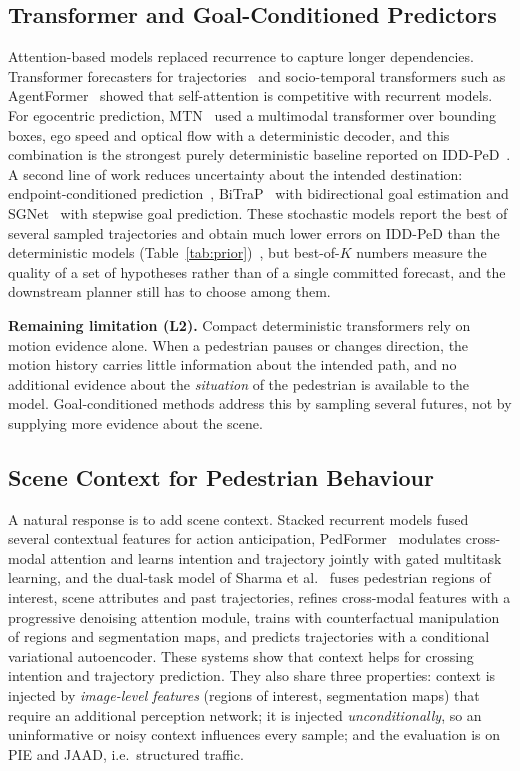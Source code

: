 \subsection{Transformer and Goal-Conditioned Predictors}
Attention-based models replaced recurrence to capture longer dependencies. Transformer forecasters for trajectories~\citep{giuliari2021transformer} and socio-temporal transformers such as AgentFormer~\citep{yuan2021agentformer} showed that self-attention is competitive with recurrent models. For egocentric prediction, MTN~\citep{yin2021mtn} used a multimodal transformer over bounding boxes, ego speed and optical flow with a deterministic decoder, and this combination is the strongest purely deterministic baseline reported on IDD-PeD~\citep{iddped2025}. A second line of work reduces uncertainty about the intended destination: endpoint-conditioned prediction~\citep{mangalam2020pecnet}, BiTraP~\citep{yao2021bitrap} with bidirectional goal estimation and SGNet~\citep{wang2022sgnet} with stepwise goal prediction. These stochastic models report the best of several sampled trajectories and obtain much lower errors on IDD-PeD than the deterministic models (Table~\ref{tab:prior})~\citep{iddped2025}, but best-of-$K$ numbers measure the quality of a set of hypotheses rather than of a single committed forecast, and the downstream planner still has to choose among them.

\textbf{Remaining limitation (L2).} Compact deterministic transformers rely on motion evidence alone. When a pedestrian pauses or changes direction, the motion history carries little information about the intended path, and no additional evidence about the \emph{situation} of the pedestrian is available to the model. Goal-conditioned methods address this by sampling several futures, not by supplying more evidence about the scene.

\subsection{Scene Context for Pedestrian Behaviour}
A natural response is to add scene context. Stacked recurrent models fused several contextual features for action anticipation, PedFormer~\citep{rasouli2022pedformer} modulates cross-modal attention and learns intention and trajectory jointly with gated multitask learning, and the dual-task model of Sharma et al.~\citep{sharma2025dual} fuses pedestrian regions of interest, scene attributes and past trajectories, refines cross-modal features with a progressive denoising attention module, trains with counterfactual manipulation of regions and segmentation maps, and predicts trajectories with a conditional variational autoencoder. These systems show that context helps for crossing intention and trajectory prediction. They also share three properties: context is injected by \emph{image-level features} (regions of interest, segmentation maps) that require an additional perception network; it is injected \emph{unconditionally}, so an uninformative or noisy context influences every sample; and the evaluation is on PIE and JAAD, i.e.\ structured traffic.

